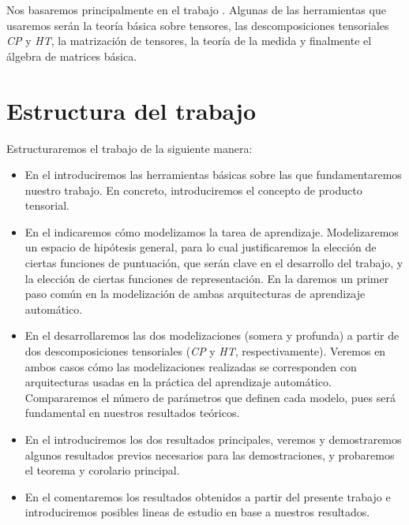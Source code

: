 Nos basaremos principalmente en el trabajo \cite{matematicas:principal}. Algunas de las herramientas que usaremos serán la teoría básica sobre tensores, las descomposiciones tensoriales \textit{CP} y \textit{HT}, la matrización de tensores, la teoría de la medida y finalmente el álgebra de matrices básica.

\section{Estructura del trabajo}

Estructuraremos el trabajo de la siguiente manera:

\begin{itemize}
	\item En el  introduciremos las herramientas básicas sobre las que fundamentaremos nuestro trabajo. En concreto, introduciremos el concepto de producto tensorial.
	\item En el  indicaremos cómo modelizamos la tarea de aprendizaje. Modelizaremos un espacio de hipótesis general, para lo cual justificaremos la elección de ciertas funciones de puntuación, que serán clave en el desarrollo del trabajo, y la elección de ciertas funciones de representación. En la  daremos un primer paso común en la modelización de ambas arquitecturas de aprendizaje automático.
	\item En el  desarrollaremos las dos modelizaciones (somera y profunda) a partir de dos descomposiciones tensoriales (\textit{CP} y \textit{HT}, respectivamente). Veremos en ambos casos cómo las modelizaciones realizadas se corresponden con arquitecturas usadas en la práctica del aprendizaje automático. Compararemos el número de parámetros que definen cada modelo, pues será fundamental en nuestros resultados teóricos.
	\item En el  introduciremos los dos resultados principales, veremos y demostraremos algunos resultados previos necesarios para las demostraciones, y probaremos el teorema y corolario principal.
	\item En el  comentaremos los resultados obtenidos a partir del presente trabajo e introduciremos posibles lineas de estudio en base a nuestros resultados.
\end{itemize}
